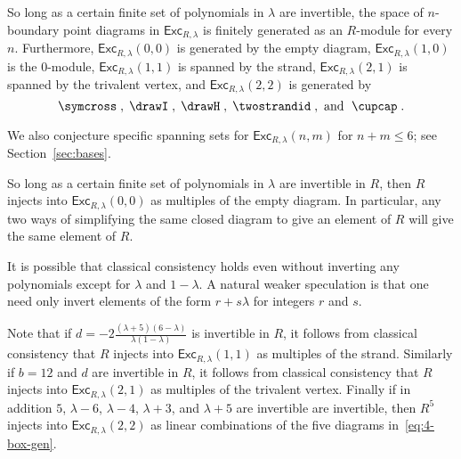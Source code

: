 \documentclass[12pt]{amsart}
\begin{document}
\begin{conjecture}
  \label{conj:class-suffic}
So long as a certain finite set of polynomials in $\lambda$ are invertible,
the space of $n$-boundary point diagrams in $\mathsf{Exc}_{R,\lambda}$ is
finitely generated as an $R$-module for every $n$.  Furthermore,
$\mathsf{Exc}_{R,\lambda}(0,0)$ is generated by the empty diagram,
$\mathsf{Exc}_{R,\lambda}(1,0)$ is the $0$-module,
$\mathsf{Exc}_{R,\lambda}(1,1)$ is spanned by the strand,
$\mathsf{Exc}_{R,\lambda}(2,1)$ is spanned by the trivalent vertex, and
$\mathsf{Exc}_{R,\lambda}(2,2)$ is generated by
\begin{equation}\label{eq:4-box-gen}
  \symcross\;, \; \drawI \;,
  \; \drawH \;, \; \twostrandid \;, \text{ and } \; \cupcap \; .
  \end{equation}
\end{conjecture}

We also conjecture specific spanning sets for $\mathsf{Exc}_{R,\lambda}(n,m)$
for $n+m \leq 6$; see Section~\ref{sec:bases}.

\begin{conjecture}
  \label{conj:class-consist}
So long as a certain finite set of polynomials in $\lambda$ are invertible in
$R$, then $R$ injects into $\mathsf{Exc}_{R,\lambda}(0,0)$ as multiples of the
empty diagram.  In particular, any two ways of simplifying the same closed
diagram to give an element of $R$ will give the same element of $R$.
\end{conjecture}

\begin{remark}
  It is possible that classical consistency
  holds even without inverting any polynomials
except for $\lambda$ and $1-\lambda$.  A natural weaker speculation is that one need
only invert elements of the form $r+s\lambda$ for integers $r$ and $s$.
\end{remark}

Note that if $d = -2\frac{(\lambda+5)(6-\lambda)}{\lambda(1-\lambda)}$ is 
invertible in $R$, it follows from classical consistency
that $R$ injects into $\mathsf{Exc}_{R,\lambda}(1,1)$ as multiples of the
strand.  Similarly if $b = 12$ and $d$ are invertible in $R$, it follows from
classical consistency that $R$ injects into $\mathsf{Exc}_{R,\lambda}(2,1)$ as
multiples of the trivalent vertex.  Finally if in addition
$5$, $\lambda-6$, $\lambda-4$, $\lambda+3$, and $\lambda+5$ are invertible
are invertible, then $R^5$ injects into $\mathsf{Exc}_{R,\lambda}(2,2)$ as
linear combinations of the five diagrams in~\eqref{eq:4-box-gen}.
\end{document}
